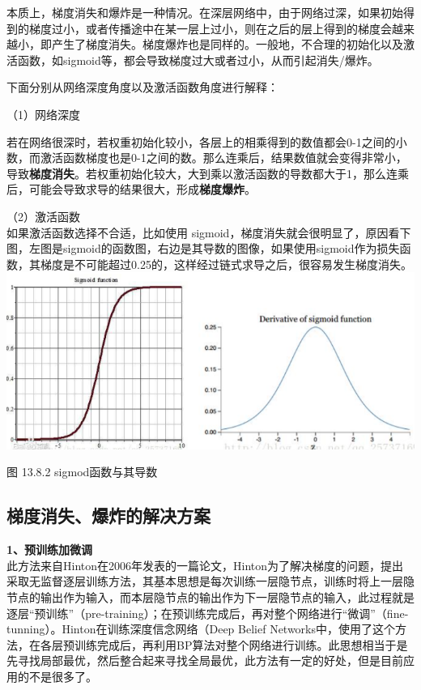 本质上，梯度消失和爆炸是一种情况。在深层网络中，由于网络过深，如果初始得到的梯度过小，或者传播途中在某一层上过小，则在之后的层上得到的梯度会越来越小，即产生了梯度消失。梯度爆炸也是同样的。一般地，不合理的初始化以及激活函数，如sigmoid等，都会导致梯度过大或者过小，从而引起消失/爆炸。

下面分别从网络深度角度以及激活函数角度进行解释：

（1）网络深度

若在网络很深时，若权重初始化较小，各层上的相乘得到的数值都会0-1之间的小数，而激活函数梯度也是0-1之间的数。那么连乘后，结果数值就会变得非常小，导致\textbf{梯度消失}。若权重初始化较大，大到乘以激活函数的导数都大于1，那么连乘后，可能会导致求导的结果很大，形成\textbf{梯度爆炸}。

（2）激活函数\\
如果激活函数选择不合适，比如使用
sigmoid，梯度消失就会很明显了，原因看下图，左图是sigmoid的函数图，右边是其导数的图像，如果使用sigmoid作为损失函数，其梯度是不可能超过0.25的，这样经过链式求导之后，很容易发生梯度消失。
\includegraphics{./img/ch13/figure_13_15_2.png}

图 13.8.2 sigmod函数与其导数

\subsection{梯度消失、爆炸的解决方案}\label{ux68afux5ea6ux6d88ux5931ux7206ux70b8ux7684ux89e3ux51b3ux65b9ux6848}

\textbf{1、预训练加微调}\\
此方法来自Hinton在2006年发表的一篇论文，Hinton为了解决梯度的问题，提出采取无监督逐层训练方法，其基本思想是每次训练一层隐节点，训练时将上一层隐节点的输出作为输入，而本层隐节点的输出作为下一层隐节点的输入，此过程就是逐层``预训练''（pre-training）；在预训练完成后，再对整个网络进行``微调''（fine-tunning）。Hinton在训练深度信念网络（Deep
Belief
Networks中，使用了这个方法，在各层预训练完成后，再利用BP算法对整个网络进行训练。此思想相当于是先寻找局部最优，然后整合起来寻找全局最优，此方法有一定的好处，但是目前应用的不是很多了。


